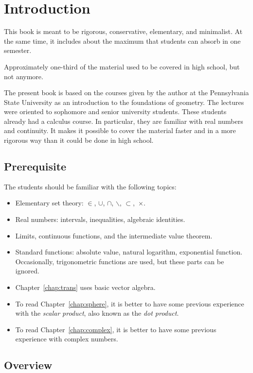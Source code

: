 \chapter*{Introduction}

This book is meant to be 
rigorous, 
conservative, 
elementary, 
and minimalist.
At the same time, it includes about the maximum that students can absorb in one semester.

Approximately one-third of the material used to be covered in high school, but not anymore.

The present book is based 
on the courses given by the author 
at the Pennsylvania State University
as an introduction to the foundations of geometry.
The lectures were oriented to sophomore and senior university students.  
These students already had a calculus course.
In particular, they are familiar with real numbers and continuity.
It makes it possible to cover the material faster 
and  in a more rigorous way
than it could be done in high school.

\section{Prerequisite}


The students should be familiar 
with the following topics:
\begin{itemize}
\item Elementary set theory: 
$\in$,
$\cup$, 
$\cap$,
$\backslash$,
$\subset$,~$\times$.
\item Real numbers: intervals, inequalities, algebraic identities.
\item Limits, continuous functions, and the intermediate value theorem.
\item Standard functions: 
absolute value, 
natural logarithm,
exponential function. 
Occasionally, trigonometric functions  are used, 
but these parts can be ignored.
\item  Chapter~\ref{chap:trans} uses basic vector algebra.
\item To read Chapter~\ref{chap:sphere}, it is better to have some previous experience with the {}\emph{scalar product}, also known as the {}\emph{dot product}.
\item To read Chapter~\ref{chap:complex}, it is better to have some previous experience with complex numbers.
\end{itemize} 

\section{Overview}

